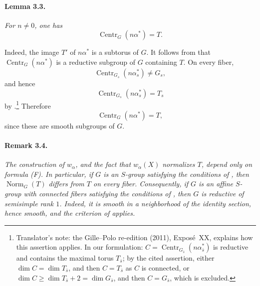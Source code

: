 \paragraph{\textbf{Lemma 3.3.}}
\emph{For \(n\ne0\), one has}
\[
  \operatorname{Centr}_G(n\alpha^\ast)=T.
\]

Indeed, the image \(T'\) of \(n\alpha^\ast\) is a subtorus of
\(G\). It follows from  that
\(\operatorname{Centr}_G(n\alpha^\ast)\) is a reductive subgroup
of \(G\) containing \(T\). On every fiber,
\[
  \operatorname{Centr}_{G_s}(n\alpha^\ast_s)\ne G_s,
\]
and hence
\[
  \operatorname{Centr}_{G_s}(n\alpha^\ast_s)=T_s
\]
by .\footnote{Translator's note: the Gille--Polo re-edition (2011), Exposé~XX, explains how this assertion
applies. In our formulation: \(C=\operatorname{Centr}_{G_{\bar s}}(n\alpha^\ast_{\bar s})\) is
reductive and contains the maximal torus \(T_{\bar s}\); by the cited assertion, either
\(\dim C=\dim T_{\bar s}\), and then \(C=T_{\bar s}\) as \(C\) is connected, or
\(\dim C\geq\dim T_{\bar s}+2=\dim G_{\bar s}\), and then \(C=G_{\bar s}\), which is excluded.}
Therefore
\[
  \operatorname{Centr}_G(n\alpha^\ast)=T,
\]
since these are smooth subgroups of \(G\).

\paragraph{\textbf{Remark 3.4.}}
\emph{The construction of \(w_\alpha\), and the fact that
\(w_\alpha(X)\) normalizes \(T\), depend only on formula
\textup{(F)}. In particular, if \(G\) is an \(S\)-group satisfying
the conditions of , then \(\operatorname{Norm}_G(T)\) differs
from \(T\) on every fiber. Consequently, if \(G\) is an affine
\(S\)-group with connected fibers satisfying the conditions of ,
then \(G\) is reductive of semisimple rank \(1\). Indeed, it is
smooth in a neighborhood of the identity section, hence smooth, and
the criterion of  applies.}
